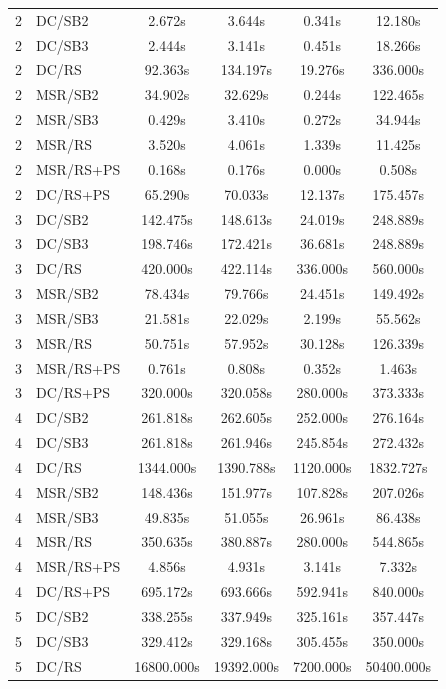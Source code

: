 \documentclass[10pt,a4paper]{article}
\begin{document}
\begin{longtable}{c l c c c c}
2 & DC/SB2 & 2.672s & 3.644s & 0.341s & 12.180s \\
2 & DC/SB3 & 2.444s & 3.141s & 0.451s & 18.266s \\
2 & DC/RS & 92.363s & 134.197s & 19.276s & 336.000s \\
2 & MSR/SB2 & 34.902s & 32.629s & 0.244s & 122.465s \\
2 & MSR/SB3 & 0.429s & 3.410s & 0.272s & 34.944s \\
2 & MSR/RS & 3.520s & 4.061s & 1.339s & 11.425s \\
2 & MSR/RS+PS & 0.168s & 0.176s & 0.000s & 0.508s \\
2 & DC/RS+PS & 65.290s & 70.033s & 12.137s & 175.457s \\
\midrule
3 & DC/SB2 & 142.475s & 148.613s & 24.019s & 248.889s \\
3 & DC/SB3 & 198.746s & 172.421s & 36.681s & 248.889s \\
3 & DC/RS & 420.000s & 422.114s & 336.000s & 560.000s \\
3 & MSR/SB2 & 78.434s & 79.766s & 24.451s & 149.492s \\
3 & MSR/SB3 & 21.581s & 22.029s & 2.199s & 55.562s \\
3 & MSR/RS & 50.751s & 57.952s & 30.128s & 126.339s \\
3 & MSR/RS+PS & 0.761s & 0.808s & 0.352s & 1.463s \\
3 & DC/RS+PS & 320.000s & 320.058s & 280.000s & 373.333s \\
\midrule
4 & DC/SB2 & 261.818s & 262.605s & 252.000s & 276.164s \\
4 & DC/SB3 & 261.818s & 261.946s & 245.854s & 272.432s \\
4 & DC/RS & 1344.000s & 1390.788s & 1120.000s & 1832.727s \\
4 & MSR/SB2 & 148.436s & 151.977s & 107.828s & 207.026s \\
4 & MSR/SB3 & 49.835s & 51.055s & 26.961s & 86.438s \\
4 & MSR/RS & 350.635s & 380.887s & 280.000s & 544.865s \\
4 & MSR/RS+PS & 4.856s & 4.931s & 3.141s & 7.332s \\
4 & DC/RS+PS & 695.172s & 693.666s & 592.941s & 840.000s \\
\midrule
5 & DC/SB2 & 338.255s & 337.949s & 325.161s & 357.447s \\
5 & DC/SB3 & 329.412s & 329.168s & 305.455s & 350.000s \\
5 & DC/RS & 16800.000s & 19392.000s & 7200.000s & 50400.000s \\

\end{longtable}
\end{document}
